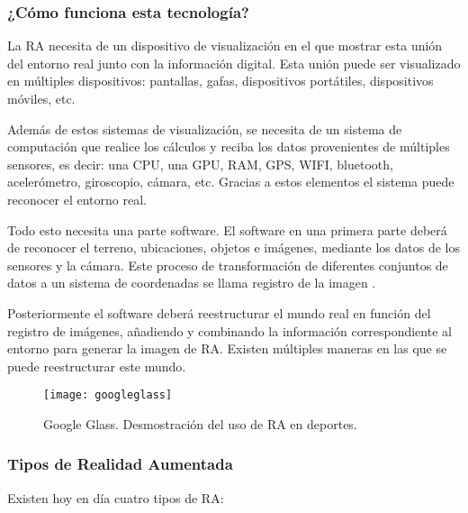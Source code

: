 \subsubsection{¿Cómo funciona esta tecnología?}
La RA necesita de un dispositivo de visualización en el que mostrar esta unión del entorno real junto con la información digital. Esta unión puede ser visualizado en múltiples dispositivos: pantallas, gafas, dispositivos portátiles, dispositivos móviles, etc.
 
Además de estos sistemas de visualización, se necesita de un sistema de computación que realice los cálculos y reciba los datos provenientes de múltiples sensores, es decir: una CPU, una GPU, RAM, GPS, WIFI, bluetooth, acelerómetro, giroscopio, cámara, etc. Gracias a estos elementos el sistema puede reconocer el entorno real.

Todo esto necesita una parte software. El software en una primera parte deberá de reconocer el terreno, ubicaciones, objetos e imágenes, mediante los datos de los sensores y la cámara. Este proceso de transformación de diferentes conjuntos de datos a un sistema de coordenadas se llama registro de la imagen \cite{URL::ImageRegister}. 

Posteriormente el software deberá reestructurar el mundo real en función del registro de imágenes, añadiendo y combinando la información correspondiente al entorno para generar la imagen de RA. Existen múltiples maneras en las que se puede reestructurar este mundo. 

\begin{figure}[h]
    \centering
    \texttt{[image: googleglass]}
    \caption{Google Glass. Desmostración del uso de RA en deportes.}
    \label{fig:googleglass}
\end{figure}

\subsubsection{Tipos de Realidad Aumentada}

Existen hoy en día cuatro tipos de RA:

